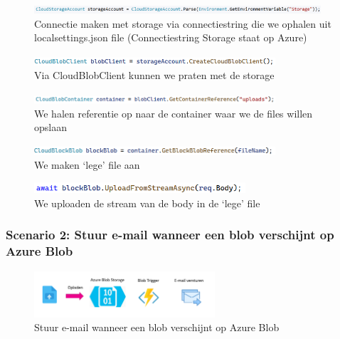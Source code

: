 \documentclass{article}
\begin{document}
\begin{figure}[H]
    \centering
    \includegraphics[width=0.95\textwidth]{scenario-1-4.png}
    \caption{Connectie maken met storage via connectiestring die we ophalen uit localsettings.json file (Connectiestring Storage staat op Azure)}
\end{figure}

\begin{figure}[H]
    \centering
    \includegraphics[width=0.8\textwidth]{scenario-1-6.png}
    \caption{Via CloudBlobClient kunnen we praten met de storage}
\end{figure}

\begin{figure}[H]
    \centering
    \includegraphics[width=0.8\textwidth]{scenario-1-7.png}
    \caption{We halen referentie op naar de container waar we de files willen opslaan}
\end{figure}

\begin{figure}[H]
    \centering
    \includegraphics[width=0.8\textwidth]{scenario-1-8.png}
    \caption{We maken `lege' file aan}
\end{figure}

\begin{figure}[H]
    \centering
    \includegraphics[width=0.7\textwidth]{scenario-1-9.png}
    \caption{We uploaden de stream van de body in de `lege' file}
\end{figure}

\subsubsection{Scenario 2: Stuur e-mail wanneer een blob verschijnt op Azure Blob}

\begin{figure}[H]
    \centering
    \includegraphics[width=0.6\textwidth]{azure-storage-scenario-2.png}
    \caption{Stuur e-mail wanneer een blob verschijnt op Azure Blob}
\end{figure}
\end{document}
